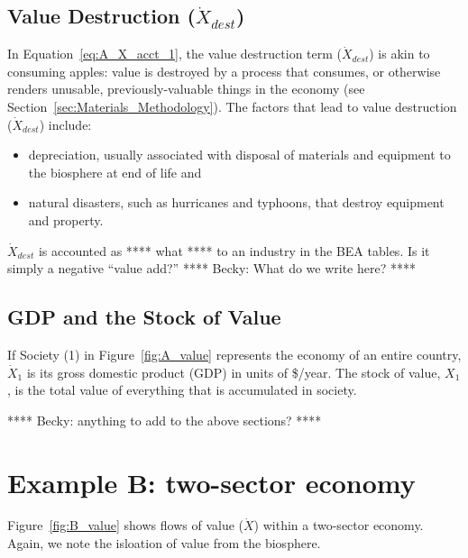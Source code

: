 \subsection{Value Destruction ($\dot{X}_{dest}$)}

\noindent In Equation~\ref{eq:A_X_acct_1}, 
the value destruction term ($\dot{X}_{dest}$) 
is akin to consuming apples: 
value is destroyed by a process that consumes, 
or otherwise renders unusable, 
previously-valuable things in the economy
(see Section~\ref{sec:Materials_Methodology}).
The factors that lead to value destruction
($\dot{X}_{dest}$) include:

\begin{itemize}
	\item{depreciation, usually associated with disposal of 
	materials and equipment to the biosphere at end of life and}
	\item{natural disasters, such as hurricanes and typhoons,
	that destroy equipment and property.}
\end{itemize}

$\dot{X}_{dest}$ is accounted as **** what **** to an industry in the BEA tables.
Is it simply a negative ``value add?''
**** Becky: What do we write here? ****


\subsection{GDP and the Stock of Value}

If Society (1) in Figure~\ref{fig:A_value} represents 
the economy of an entire country, 
$\dot{X}_{1}$ is its gross domestic product (GDP)
in units of \$/year.
The stock of value, $X_1$, is the total value of everything that 
is accumulated in society.

**** Becky: anything to add to the above sections? ****


\section{Example B: two-sector economy} %

Figure~\ref{fig:B_value} shows flows of value ($\dot{X}$) 
within a two-sector economy. 
Again, we note the isloation of value from the biosphere.

